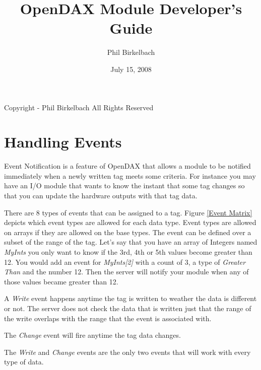 

\title{OpenDAX Module Developer's Guide}
\date{July 15, 2008}
\author{Phil Birkelbach}


\maketitle
\begin{flushleft}
Copyright  - Phil Birkelbach\linebreak
All Rights Reserved

\end{flushleft}

\tableofcontents
\newpage
{}







\chapter{Handling Events}
Event Notification is a feature of OpenDAX that allows a module to be notified immediately when a newly written tag meets some criteria.  For instance you may have an I/O module that wants to know the instant that some tag changes so that you can update the hardware outputs with that tag data.

There are 8 types of events that can be assigned to a tag.  Figure \ref{Event Matrix} depicts which event types are allowed for each data type.  Event types are allowed on arrays if they are allowed on the base types.  The event can be defined over a subset of the range of the tag.  Let's say that you have an array of Integers named \textit{MyInts} you only want to know if the 3rd, 4th or 5th values become greater than 12.  You would add an event for \textit{MyInts[2]} with a count of 3, a type of \textit{Greater Than} and the number 12.  Then the server will notify your module when any of those values became greater than 12.

A \textit{Write} event happens anytime the tag is written to weather the data is different or not.  The server does not check the data that is written just that the range of the write overlaps with the range that the event is associated with.

The \textit{Change} event will fire anytime the tag data changes.

The \textit{Write} and \textit{Change} events are the only two events that will work with every type of data.

